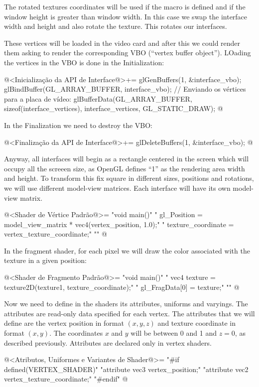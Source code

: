 The rotated textures coordinates will be used if the
macro  is defined and if the window
height is greater than window width. In this case we swap the
interface width and height and also rotate the texture. This rotates
our interfaces.

These vertices will be loaded in the video card and after this we
could render them asking to render the corresponding VBO (``vertex
buffer object''). LOading the vertices in the VBO is done in the
Initialization:

\iniciocodigo
@<Inicialização da API de Interface@>+=
glGenBuffers(1, &interface_vbo);
glBindBuffer(GL_ARRAY_BUFFER, interface_vbo);
// Enviando os vértices para a placa de vídeo:
glBufferData(GL_ARRAY_BUFFER, sizeof(interface_vertices), interface_vertices,
             GL_STATIC_DRAW);
@
\fimcodigo

In the Finalization we need to destroy the VBO:

\iniciocodigo
@<Finalização da API de Interface@>+=
glDeleteBuffers(1, &interface_vbo);
@
\fimcodigo

Anyway, all interfaces will begin as a rectangle centered in the
screen which will occupy all the screeen size, as OpenGL defines ``1''
as the rendering area width and height. To transform this fix square
in different sizes, positions and rotations, we will use different
model-view matrices. Each interface will have its own model-view
matrix.

\iniciocodigo
@<Shader de Vértice Padrão@>=
"void main(){\n"
"  gl_Position = model_view_matrix * vec4(vertex_position, 1.0);\n"
"  texture_coordinate = vertex_texture_coordinate;\n"
"}\n"
@
\fimcodigo


In the fragment shader, for each pixel we will draw the color
associated with the texture in a given position:

\iniciocodigo
@<Shader de Fragmento Padrão@>=
"void main(){\n"
"  vec4 texture = texture2D(texture1, texture_coordinate);\n"
"  gl_FragData[0] = texture;\n"
"}\n"
@
\fimcodigo

Now we need to define in the shaders its attributes, uniforms and
varyings. The attributes are read-only data specified for each vertex.
The attributes that we will define are the vertex position in format
$(x, y, z)$ and texture coordinate in format $(x, y)$. The coordinates
$x$ and $y$ will be between 0 and 1 and $z=0$, as described
previously. Attributes are declared only in vertex shaders.

\iniciocodigo
@<Atributos, Uniformes e Variantes de Shader@>=
"#if defined(VERTEX_SHADER)\n"
"attribute vec3 vertex_position;\n"
"attribute vec2 vertex_texture_coordinate;\n"
"#endif\n"
@
\fimcodigo

